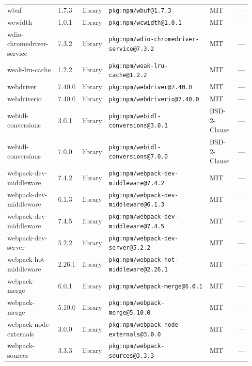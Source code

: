 \documentclass[11pt,a4paper]{article}
\begin{document}
\begin{longtable}{|p{4cm}|p{2cm}|p{1.6cm}|p{5cm}|p{1.5cm}|p{3.5cm}|}
\raggedright wbuf & 1.7.3 & library & \small\texttt{pkg:npm/wbuf@1.7.3} & MIT & \small — \\
\raggedright wcwidth & 1.0.1 & library & \small\texttt{pkg:npm/wcwidth@1.0.1} & MIT & \small — \\
\raggedright wdio-chromedriver-service & 7.3.2 & library & \small\texttt{pkg:npm/wdio-chromedriver-service@7.3.2} & MIT & \small — \\
\raggedright weak-lru-cache & 1.2.2 & library & \small\texttt{pkg:npm/weak-lru-cache@1.2.2} & MIT & \small — \\
\raggedright webdriver & 7.40.0 & library & \small\texttt{pkg:npm/webdriver@7.40.0} & MIT & \small — \\
\raggedright webdriverio & 7.40.0 & library & \small\texttt{pkg:npm/webdriverio@7.40.0} & MIT & \small — \\
\raggedright webidl-conversions & 3.0.1 & library & \small\texttt{pkg:npm/webidl-conversions@3.0.1} & BSD-2-Clause & \small — \\
\raggedright webidl-conversions & 7.0.0 & library & \small\texttt{pkg:npm/webidl-conversions@7.0.0} & BSD-2-Clause & \small — \\
\raggedright webpack-dev-middleware & 7.4.2 & library & \small\texttt{pkg:npm/webpack-dev-middleware@7.4.2} & MIT & \small — \\
\raggedright webpack-dev-middleware & 6.1.3 & library & \small\texttt{pkg:npm/webpack-dev-middleware@6.1.3} & MIT & \small — \\
\raggedright webpack-dev-middleware & 7.4.5 & library & \small\texttt{pkg:npm/webpack-dev-middleware@7.4.5} & MIT & \small — \\
\raggedright webpack-dev-server & 5.2.2 & library & \small\texttt{pkg:npm/webpack-dev-server@5.2.2} & MIT & \small — \\
\raggedright webpack-hot-middleware & 2.26.1 & library & \small\texttt{pkg:npm/webpack-hot-middleware@2.26.1} & MIT & \small — \\
\raggedright webpack-merge & 6.0.1 & library & \small\texttt{pkg:npm/webpack-merge@6.0.1} & MIT & \small — \\
\raggedright webpack-merge & 5.10.0 & library & \small\texttt{pkg:npm/webpack-merge@5.10.0} & MIT & \small — \\
\raggedright webpack-node-externals & 3.0.0 & library & \small\texttt{pkg:npm/webpack-node-externals@3.0.0} & MIT & \small — \\
\raggedright webpack-sources & 3.3.3 & library & \small\texttt{pkg:npm/webpack-sources@3.3.3} & MIT & \small — \\

\end{longtable}
\end{document}

